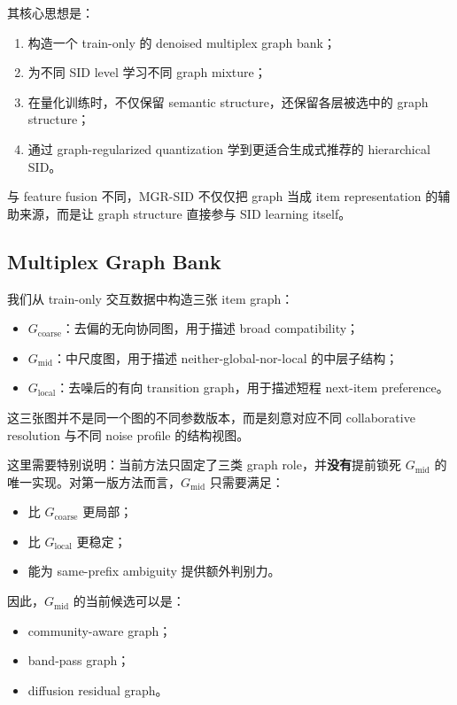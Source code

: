 \documentclass[11pt]{article}
\begin{document}
其核心思想是：
\begin{enumerate}
  \item 构造一个 train-only 的 denoised multiplex graph bank；
  \item 为不同 SID level 学习不同 graph mixture；
  \item 在量化训练时，不仅保留 semantic structure，还保留各层被选中的 graph structure；
  \item 通过 graph-regularized quantization 学到更适合生成式推荐的 hierarchical SID。
\end{enumerate}

与 feature fusion 不同，MGR-SID 不仅仅把 graph 当成 item representation 的辅助来源，而是让 graph structure 直接参与 SID learning itself。

\subsection{Multiplex Graph Bank}

我们从 train-only 交互数据中构造三张 item graph：
\begin{itemize}
  \item \textbf{$G_{\text{coarse}}$}：去偏的无向协同图，用于描述 broad compatibility；
  \item \textbf{$G_{\text{mid}}$}：中尺度图，用于描述 neither-global-nor-local 的中层子结构；
  \item \textbf{$G_{\text{local}}$}：去噪后的有向 transition graph，用于描述短程 next-item preference。
\end{itemize}

这三张图并不是同一个图的不同参数版本，而是刻意对应不同 collaborative resolution 与不同 noise profile 的结构视图。

这里需要特别说明：当前方法只固定了三类 graph role，并\textbf{没有}提前锁死 $G_{\text{mid}}$ 的唯一实现。对第一版方法而言，$G_{\text{mid}}$ 只需要满足：
\begin{itemize}
  \item 比 $G_{\text{coarse}}$ 更局部；
  \item 比 $G_{\text{local}}$ 更稳定；
  \item 能为 same-prefix ambiguity 提供额外判别力。
\end{itemize}

因此，$G_{\text{mid}}$ 的当前候选可以是：
\begin{itemize}
  \item community-aware graph；
  \item band-pass graph；
  \item diffusion residual graph。
\end{itemize}
\end{document}
